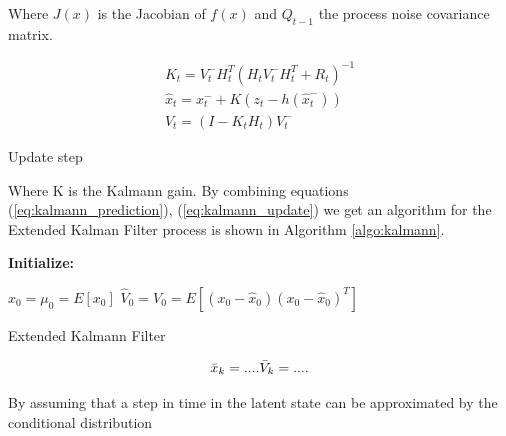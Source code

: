\documentclass[mscthesis]{usiinfthesis}
\begin{document}
Where $J(x)$ is the Jacobian of $f(x)$ and $Q_{t-1}$ the process noise covariance matrix.


\begin{eqfloat}[H]
\begin{equation}
\begin{array}{l}
K_t = V_t^- H^T_t (H_t V_t^- H^T_t + R_t)^{-1} \\
\hat{x}_t = x_t^- + K (z_t - h(\hat{x}_t^-)) \\
V_t = (I-K_t H_t)V_t^-
\end{array}
\label{eq:kalman_update}
\end{equation}
\caption{Update step}
\label{eq:kalmann_update}
\end{eqfloat}

Where K is the Kalmann gain. By combining equations (\ref{eq:kalmann_prediction}), (\ref{eq:kalmann_update}) we get an algorithm for the Extended Kalman Filter process is shown in Algorithm \ref{algo:kalmann}. 

\begin{algorithm}[H]
\textbf{Initialize: }
\begin{substeps}
$\hat{x}_0 = \mu_0 = E[x_0]$ \;
$\hat{V}_0 = V_0 = E[(x_0-\hat{x}_0)(x_0-\hat{x}_0)^T]$  \;
\end{substeps}
  \caption{Extended Kalmann Filter}
  \label{algo:kalmann}
\end{algorithm}







\[
\bar{x}_{k} = .... \\
\bar{V}_{k} = ....
\]

By assuming that a step in time in the latent state can be approximated by the conditional distribution 
\end{document}
